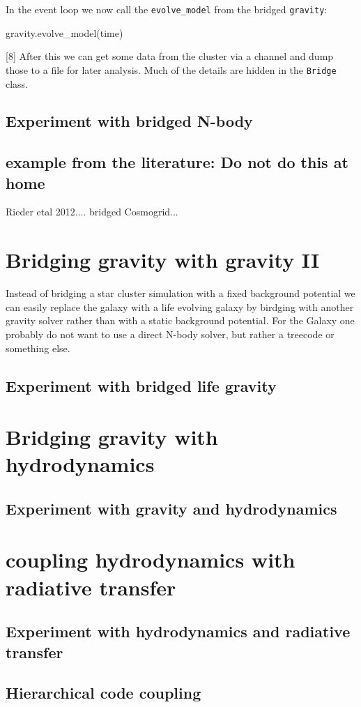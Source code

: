 In the event loop we now call the {\tt evolve\_model} from the bridged
{\tt gravity}:
\begin{verbatimtab}[8]
        gravity.evolve_model(time)
\end{verbatimtab}[8]
After this we can get some data from the cluster via a channel and
dump those to a file for later analysis.  Much of the details are
hidden in the {\tt Bridge} class.

\subsection{Experiment with bridged N-body}

\subsection{example from the literature: Do not do this at home}

Rieder etal 2012.... bridged Cosmogrid...

\section{Bridging gravity with gravity II}

Instead of bridging a star cluster simulation with a fixed background
potential we can easily replace the galaxy with a life evolving galaxy
by birdging with another gravity solver rather than with a static
background potential.  For the Galaxy one probably do not want to use
a direct N-body solver, but rather a treecode or something else.



\subsection{Experiment with bridged life gravity}

\section{Bridging gravity with hydrodynamics}
\subsection{Experiment with gravity and hydrodynamics}

\section{coupling hydrodynamics with radiative transfer}
\subsection{Experiment with hydrodynamics and radiative transfer}



\subsection{Hierarchical code coupling}


%
